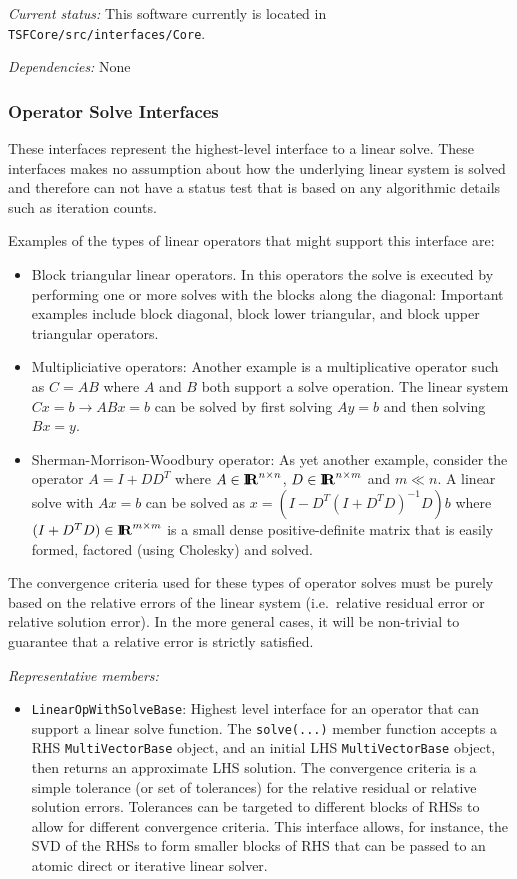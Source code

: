\documentclass[pdf,ps2pdf,11pt]{SANDreport}
\begin{document}
{}\textit{Current status:} This software currently is located in
{}\texttt{TSFCore/src/interfaces/Core}.

{}\textit{Dependencies:} None


%
\subsubsection{Operator Solve Interfaces}
%

These interfaces represent the highest-level interface to a linear solve.
These interfaces makes no assumption about how the underlying linear system is
solved and therefore can not have a status test that is based on any
algorithmic details such as iteration counts.

Examples of the types of linear operators that might support this interface
are:
%
\begin{itemize}
%
{}\item Block triangular linear operators.  In this operators the solve is
executed by performing one or more solves with the blocks along the diagonal:
Important examples include block diagonal, block lower triangular, and block
upper triangular operators.
%
{}\item Multipliciative operators: Another example is a multiplicative
operator such as $C = A B$ where $A$ and $B$ both support a solve operation.
The linear system $C x = b {}\rightarrow A B x = b$ can be solved by first
solving $A y = b$ and then solving $B x = y$.
%
{}\item Sherman-Morrison-Woodbury operator: As yet another example, consider
the operator $A = I + D D^T$ where $A\in\mbox{\textbf{I}}\hspace{-0.6ex}\mbox{\textbf{R}}^{n {}\times n}$, $D\in\mbox{\textbf{I}}\hspace{-0.6ex}\mbox{\textbf{R}}^{n
{}\times m}$ and $m {}\ll n$.  A linear solve with $A x = b$ can be solved as
$x = (I - D^T (I + D^T D)^{-1} D) b$ where $(I + D^T D)\in\mbox{\textbf{I}}\hspace{-0.6ex}\mbox{\textbf{R}}^{m {}\times m}$
is a small dense positive-definite matrix that is easily formed, factored
(using Cholesky) and solved.
%
\end{itemize}

The convergence criteria used for these types of operator solves must be
purely based on the relative errors of the linear system (i.e.\ relative
residual error or relative solution error).  In the more general cases, it
will be non-trivial to guarantee that a relative error is strictly satisfied.

{}\textit{Representative members:}
\begin{itemize}
%
{}\item {}\texttt{LinearOpWithSolveBase}: Highest level interface for an
operator that can support a linear solve function.  The {}\texttt{solve(...)} 
member function accepts a RHS {}\texttt{MultiVectorBase} object, and an
initial LHS {}\texttt{MultiVectorBase} object, then returns an approximate LHS
solution.  The convergence criteria is a simple tolerance (or set of
tolerances) for the relative residual or relative solution errors.  Tolerances
can be targeted to different blocks of RHSs to allow for different convergence
criteria.  This interface allows, for instance, the SVD of the RHSs to form
smaller blocks of RHS that can be passed to an atomic direct or iterative
linear solver.
%
\end{itemize}
\end{document}

